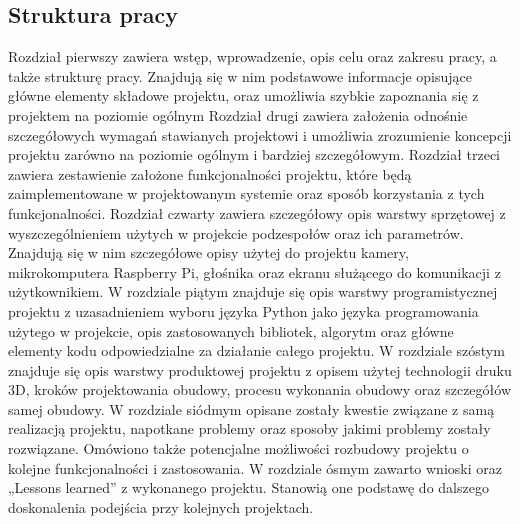 \documentclass[a4paper,12pt,reqno]{article}
\begin{document}
\subsection{Struktura pracy} %
Rozdział pierwszy zawiera wstęp, wprowadzenie, opis celu oraz zakresu pracy, a także strukturę pracy. Znajdują się w nim podstawowe informacje opisujące główne elementy składowe projektu, oraz umożliwia szybkie zapoznania się z projektem na poziomie ogólnym
\newline
Rozdział drugi zawiera założenia odnośnie szczegółowych wymagań stawianych projektowi i umożliwia zrozumienie koncepcji projektu zarówno na poziomie ogólnym i bardziej szczegółowym.
\newline
Rozdział trzeci zawiera zestawienie założone funkcjonalności projektu, które będą zaimplementowane w projektowanym systemie oraz sposób korzystania z tych funkcjonalności.
\newline
Rozdział czwarty zawiera szczegółowy opis warstwy sprzętowej z wyszczególnieniem użytych w projekcie podzespołów oraz ich parametrów. Znajdują się w nim szczegółowe opisy użytej do projektu kamery, mikrokomputera Raspberry Pi, głośnika oraz ekranu służącego do komunikacji z użytkownikiem.
\newline
W rozdziale piątym znajduje się opis warstwy programistycznej projektu z uzasadnieniem wyboru języka Python jako języka programowania użytego w projekcie, opis zastosowanych bibliotek, algorytm oraz główne elementy kodu odpowiedzialne za działanie całego projektu.
\newline
W rozdziale szóstym znajduje się opis warstwy produktowej projektu z opisem użytej technologii druku 3D, kroków projektowania obudowy, procesu wykonania obudowy oraz szczegółów samej obudowy.
\newline
W rozdziale siódmym opisane zostały kwestie związane z samą realizacją projektu, napotkane problemy oraz sposoby jakimi problemy zostały rozwiązane. Omówiono także potencjalne możliwości rozbudowy projektu o kolejne funkcjonalności i zastosowania.
\newline
W rozdziale ósmym zawarto wnioski oraz „Lessons learned” z wykonanego projektu. Stanowią one podstawę do dalszego doskonalenia podejścia przy kolejnych projektach.

\newpage
\end{document}
